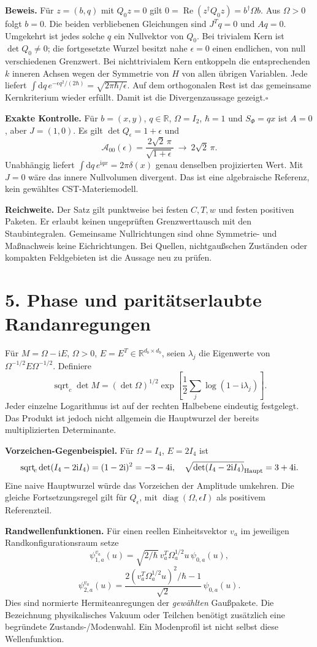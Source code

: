 \documentclass[10pt,a4paper]{article}
\newcommand{\R}{\mathbb R}
\newcommand{\dd}{\mathrm d}
\newcommand{\ii}{\mathrm i}
\newcommand{\sdet}{\operatorname{sqrt}_{\!c}\det}
\newcommand{\sect}[1]{\section*{\color{navy}#1}}
\begin{document}
\textbf{Beweis.}
Für $z=(b,q)$ mit $Q_0z=0$ gilt
$0=\operatorname{Re}(z^\dagger Q_0z)=b^\dagger\Omega b$.
Aus $\Omega>0$ folgt $b=0$. Die beiden verbliebenen Gleichungen sind
$J^Tq=0$ und $Aq=0$. Umgekehrt ist jedes solche $q$ ein Nullvektor von
$Q_0$. Bei trivialem Kern ist $\det Q_0\ne0$; die fortgesetzte Wurzel
besitzt nahe $\epsilon=0$ einen endlichen, von null verschiedenen Grenzwert.
Bei nichttrivialem Kern entkoppeln die entsprechenden $k$ inneren Achsen
wegen der Symmetrie von $H$ von allen übrigen Variablen. Jede liefert
$\int\dd q\,e^{-\epsilon q^2/(2\hbar)}=\sqrt{2\pi\hbar/\epsilon}$.
Auf dem orthogonalen Rest ist das gemeinsame Kernkriterium wieder erfüllt.
Damit ist die Divergenzaussage gezeigt.\hfill$\square$

\textbf{Exakte Kontrolle.}
Für $b=(x,y)$, $q\in\R$, $\Omega=I_2$, $\hbar=1$ und $S_\Phi=qx$
ist $A=0$, aber $J=(1,0)$. Es gilt $\det Q_\epsilon=1+\epsilon$ und
\[
\mathcal A_{00}(\epsilon)=\frac{2\sqrt2\,\pi}{\sqrt{1+\epsilon}}
\ \longrightarrow\ 2\sqrt2\,\pi.
\]
Unabhängig liefert $\int\dd q\,e^{\ii qx}=2\pi\delta(x)$ genau denselben
projizierten Wert. Mit $J=0$ wäre das innere Nullvolumen divergent.
Das ist eine algebraische Referenz, kein gewähltes CST-Materiemodell.

\textbf{Reichweite.} Der Satz gilt punktweise bei festen $C,T,w$ und festen
positiven Paketen. Er erlaubt keinen ungeprüften Grenzwerttausch mit den
Staubintegralen. Gemeinsame Nullrichtungen sind ohne Symmetrie- und
Maßnachweis keine Eichrichtungen. Bei Quellen, nichtgaußschen Zuständen oder
kompakten Feldgebieten ist die Aussage neu zu prüfen.

\newpage
\sect{5. Phase und paritätserlaubte Randanregungen}
Für $M=\Omega-\ii E$, $\Omega>0$, $E=E^T\in\R^{d_b\times d_b}$, seien
$\lambda_j$ die Eigenwerte von $\Omega^{-1/2}E\Omega^{-1/2}$. Definiere
\[
\sdet M=(\det\Omega)^{1/2}
\exp\!\left[\frac12\sum_j\log(1-\ii\lambda_j)\right].
\]
Jeder einzelne Logarithmus ist auf der rechten Halbebene eindeutig
festgelegt. Das Produkt ist jedoch nicht allgemein die Hauptwurzel der
bereits multiplizierten Determinante.

\textbf{Vorzeichen-Gegenbeispiel.} Für $\Omega=I_4$, $E=2I_4$ ist
\[
\sdet(I_4-2\ii I_4)=(1-2\ii)^2=-3-4\ii,
\quad \sqrt{\det(I_4-2\ii I_4)}_{\rm Haupt}=3+4\ii.
\]
Eine naive Hauptwurzel würde das Vorzeichen der Amplitude umkehren.
Die gleiche Fortsetzungsregel gilt für $Q_\epsilon$, mit
$\operatorname{diag}(\Omega,\epsilon I)$ als positivem Referenzteil.

\textbf{Randwellenfunktionen.} Für einen reellen Einheitsvektor $v_a$ im
jeweiligen Randkonfigurationsraum setze
\[
\psi_{1,a}^{v_a}(u)=\sqrt{2/\hbar}\,
v_a^T\Omega_a^{1/2}u\,\psi_{0,a}(u),
\]
\[
\psi_{2,a}^{v_a}(u)=\frac{2(v_a^T\Omega_a^{1/2}u)^2/\hbar-1}{\sqrt2}
\,\psi_{0,a}(u).
\]
Dies sind normierte Hermiteanregungen der \emph{gewählten} Gaußpakete. Die
Bezeichnung physikalisches Vakuum oder Teilchen benötigt zusätzlich eine
begründete Zustands-/Modenwahl. Ein Modenprofil ist nicht selbst diese
Wellenfunktion.
\end{document}
